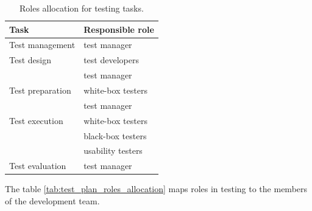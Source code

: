 \documentclass[11pt]{book}
\begin{document}
\begin{table}[H]
    \centering
    \begin{tabular}{| l | l |}
        \hline
        Task                & Responsible role              \\ \hline

        Test management     & test manager                  \\ \hline
        
        Test design         & test developers               \\
                            & test manager                  \\ \hline
        
        Test preparation    & white-box testers             \\
                            & test manager                  \\ \hline
        
        Test execution      & white-box testers             \\
                            & black-box testers             \\
                            & usability testers             \\ \hline
        
        Test evaluation     & test manager                  \\ \hline
    \end{tabular}
    \caption{Roles allocation for testing tasks.}
    \label{tab:test_plan_tasks_allocation}
\end{table}

The table \ref{tab:test_plan_roles_allocation} maps roles in testing to the members of the development team.
\end{document}
